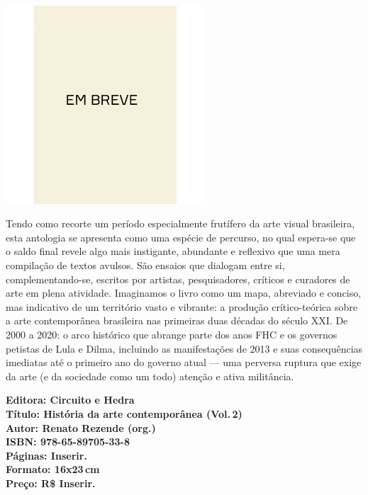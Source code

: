 \begin{center}
\hspace*{.5cm}\includegraphics[width=74mm]{./CAPAS/breve.jpeg}
\end{center}
\hspace*{-7cm}\hrulefill\hspace*{-7cm}
\medskip

\noindent{}Tendo como recorte um período especialmente frutífero da arte visual brasileira, esta antologia se apresenta como uma espécie de percurso, no qual espera-se que o saldo final revele algo mais instigante, abundante e reflexivo que uma mera compilação de textos avulsos. São ensaios que dialogam entre si, complementando-se, escritos por artistas, pesquisadores, críticos e curadores de arte em plena atividade. Imaginamos o livro como um mapa, abreviado e conciso, mas indicativo de um território vasto e vibrante: a produção crítico-teórica sobre a arte contemporânea brasileira nas primeiras duas décadas do século XXI. De 2000 a 2020: o arco histórico que abrange parte dos anos FHC e os governos petistas de Lula e Dilma, incluindo as manifestações de 2013 e suas consequências imediatas até o primeiro ano do governo atual --- uma perversa ruptura que exige da arte (e da sociedade como um todo) atenção e ativa militância.

\vfill
\noindent\begin{minipage}[c]{1\linewidth}
{\small\textbf{
\hspace*{-.1cm}Editora: Circuito e Hedra\\
Título: História da arte contemporânea (Vol.\,2)\\
Autor: Renato Rezende (org.)\\ 
ISBN: 978-65-89705-33-8\\
Páginas: Inserir.\\
Formato: 16x23\,cm\\
Preço: R\$ Inserir.\\
}}
\end{minipage}
\pagebreak

